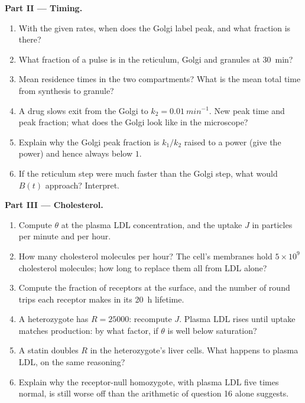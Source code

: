 \begin{problem}
\medskip
\noindent\textbf{Part II --- Timing.}
\begin{enumerate}[resume]
  \item With the given rates, when does the Golgi label peak, and what
        fraction is there?
  \item What fraction of a pulse is in the reticulum, Golgi and
        granules at \qty{30}{min}?
  \item Mean residence times in the two compartments? What is the mean
        total time from synthesis to granule?
  \item A drug slows exit from the Golgi to $k_{2} = \qty{0.01}{min^{-1}}$.
        New peak time and peak fraction; what does the Golgi look like
        in the microscope?
  \item Explain why the Golgi peak fraction is $k_{1}/k_{2}$ raised to a
        power (give the power) and hence always below $1$.
  \item If the reticulum step were much faster than the Golgi step,
        what would $B(t)$ approach? Interpret.
\end{enumerate}

\medskip
\noindent\textbf{Part III --- Cholesterol.}
\begin{enumerate}[resume]
  \item Compute $\theta$ at the plasma LDL concentration, and the
        uptake $J$ in particles per minute and per hour.
  \item How many cholesterol molecules per hour? The cell's membranes
        hold $5\times 10^{9}$ cholesterol molecules; how long to replace
        them all from LDL alone?
  \item Compute the fraction of receptors at the surface, and the
        number of round trips each receptor makes in its \qty{20}{h}
        lifetime.
  \item A heterozygote has $R = \num{25000}$: recompute $J$. Plasma LDL
        rises until uptake matches production: by what factor, if
        $\theta$ is well below saturation?
  \item A statin doubles $R$ in the heterozygote's liver cells. What
        happens to plasma LDL, on the same reasoning?
  \item Explain why the receptor-null homozygote, with plasma LDL five
        times normal, is still worse off than the arithmetic of question
        16 alone suggests.
\end{enumerate}


\end{problem}
